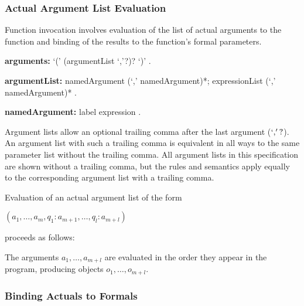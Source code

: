 \documentclass{article}
\begin{document}


\subsubsection{ Actual Argument List Evaluation}

\LMHash{}
Function invocation involves evaluation of the list of actual arguments to the function and binding of the results to the function's formal parameters.

\begin{grammar}
{\bf arguments:}
      `(' (argumentList  `,'?)? `)'
    .

{\bf argumentList:}
      namedArgument (`,' namedArgument)*;
      expressionList (`,' namedArgument)*
    .

{\bf namedArgument:}
      label expression %
    .
 \end{grammar}

Argument lists allow an optional trailing comma after the last argument ($`,'?$). An argument list with such a trailing comma is equivalent in all ways to the same parameter list without the trailing comma. All argument lists in this specification are shown without a trailing comma, but the rules and semantics apply equally to the corresponding argument list with a trailing comma.

\LMHash{}
Evaluation of an actual argument list of the form

$(a_1, \ldots, a_m, q_1: a_{m+1}, \ldots, q_l: a_{m+l})$

proceeds as follows:

\LMHash{}
The arguments $a_1, \ldots, a_{m+l}$ are evaluated in the order they appear in the program, producing objects $o_1, \ldots, o_{m+l}$.



\subsubsection{ Binding Actuals to Formals}
\end{document}
